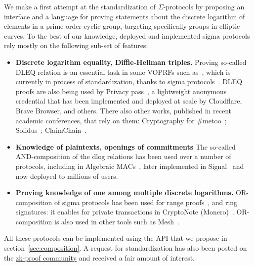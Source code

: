 \documentclass[runningheads]{llncs}
\begin{document}
We make a first attempt at the standardization of $\Sigma$-protocols by proposing an interface and a language for proving statements about the discrete logarithm of elements in a prime-order cyclic group, targeting specifically groups in elliptic curves. To the best of our knowledge, deployed and implemented sigma protocols rely mostly on the following sub-set of features:

\begin{itemize}
  \item \textbf{Discrete logarithm equality, Diffie-Hellman triples.}
  Proving so-called DLEQ relation is an essential task in some VOPRFs such as~\cite{AC:JarKiaKra14},
  which is currently in process of standardization, thanks to sigma protocols~\cite{cfrg-voprf}.
  DLEQ proofs are also being used by Privacy pass~\cite{PoPETS:DGSTV18}, a lightweight anonymous credential that has been implemented and deployed at scale by Cloudflare, Brave
  Browser, and others.
  There also other works, published in recent academic conferences, that rely on them: Cryptography for \#metoo~\cite{PoPETS:KuyKraRab19}; Solidus~\cite{CCS:CZJKJS17}; ClaimChain~\cite{ClaimChain}.
  \item \textbf{Knowledge of plaintexts, openings of commitments}
  The so-called AND-composition of the dlog relations has been used over a number of protocols,
  including in Algebraic MACs~\cite{CCS:ChaMeiZav14},
  later implemented in Signal~\cite{CCS:ChaPerZav20} and now deployed to millions of users.
  \item \textbf{Proving knowledge of one among multiple discrete logarithms.}
  OR-composition of sigma protocols
  has been used for range proofs~\cite{borromeansig}, and ring signatures: it enables for private transactions in CryptoNote (Monero)~\cite{monero}.
  OR-composition is also used in other tools such as Mesh~\cite{PoPETS:AlTGon19}.
\end{itemize}


All these protocols can be implemented using the API that we propose in section~\cref{sec:composition}.
A request for standardization has also been posted on the \href{https://community.zkproof.org/t/standardizing-sigma-protocols/471/}{zk-proof community} and received a fair amount of interest.
\end{document}
